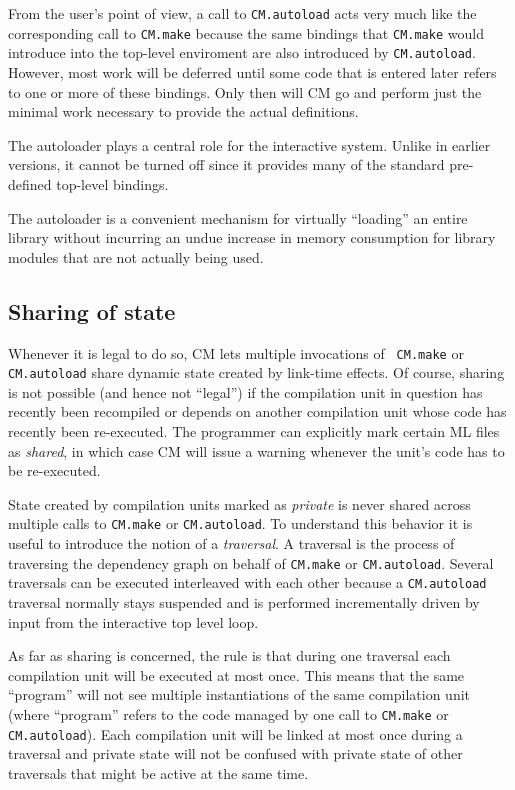 \documentclass[titlepage,letterpaper]{article}
\begin{document}
From the user's point of view, a call to {\tt CM.autoload} acts very
much like the corresponding call to {\tt CM.make} because the same
bindings that {\tt CM.make} would introduce into the top-level
enviroment are also introduced by {\tt CM.autoload}.  However, most
work will be deferred until some code that is entered later refers to
one or more of these bindings.  Only then will CM go and perform just
the minimal work necessary to provide the actual definitions.

The autoloader plays a central role for the interactive system.
Unlike in earlier versions, it cannot be turned off since it provides
many of the standard pre-defined top-level bindings.

The autoloader is a convenient mechanism for virtually ``loading'' an
entire library without incurring an undue increase in memory
consumption for library modules that are not actually being used.

\subsection{Sharing of state}
\label{sec:sharing}

Whenever it is legal to do so, CM lets multiple invocations of {\tt
CM.make} or {\tt CM.autoload} share dynamic state created by link-time
effects.  Of course, sharing is not possible (and hence not ``legal'')
if the compilation unit in question has recently been recompiled or
depends on another compilation unit whose code has recently been
re-executed.  The programmer can explicitly mark certain ML files as
{\em shared}, in which case CM will issue a warning whenever the
unit's code has to be re-executed.

State created by compilation units marked as {\em private} is never
shared across multiple calls to {\tt CM.make} or {\tt CM.autoload}.
To understand this behavior it is useful to introduce the notion of a
{\em traversal}.  A traversal is the process of traversing the
dependency graph on behalf of {\tt CM.make} or {\tt CM.autoload}.
Several traversals can be executed interleaved with each other because
a {\tt CM.autoload} traversal normally stays suspended and is
performed incrementally driven by input from the interactive top level
loop.

As far as sharing is concerned, the rule is that during one traversal
each compilation unit will be executed at most once.  This means that
the same ``program'' will not see multiple instantiations of the same
compilation unit (where ``program'' refers to the code managed by one
call to {\tt CM.make} or {\tt CM.autoload}).  Each compilation unit
will be linked at most once during a traversal and private state
will not be confused with private state of other traversals that might
be active at the same time.
\end{document}

